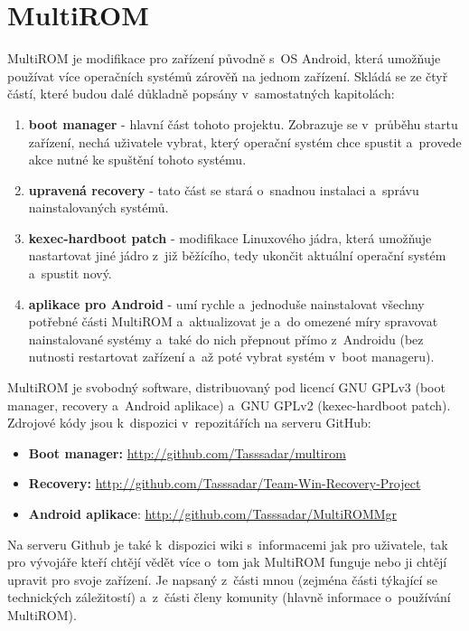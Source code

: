 \documentclass[12pt, a4paper, oneside]{article}
\newcommand{\B}{\textbf} %
\begin{document}
\section{MultiROM}
MultiROM je modifikace pro zařízení původně s~OS Android, která umožňuje používat více operačních systémů zárověň na jednom zařízení. Skládá se ze čtyř částí, které budou dalé důkladně popsány v~samostatných kapitolách:

\begin{enumerate}
    \item \B{boot manager} - hlavní část tohoto projektu. Zobrazuje se v~průběhu startu zařízení, nechá uživatele vybrat, který operační systém chce spustit a~provede akce nutné ke spuštění tohoto systému.
    \item \B{upravená recovery} - tato část se stará o~snadnou instalaci a~správu nainstalovaných systémů.
    \item \B{kexec-hardboot patch} - modifikace Linuxového jádra, která umožňuje nastartovat jiné jádro z~již běžícího, tedy ukončit aktuální operační systém a~spustit nový.
    \item \B{aplikace pro Android} - umí rychle a~jednoduše nainstalovat všechny potřebné části MultiROM a~aktualizovat je a~do omezené míry spravovat nainstalované systémy a~také do nich přepnout přímo z~Androidu (bez nutnosti restartovat zařízení a~až poté vybrat systém v~boot manageru).
\end{enumerate}

MultiROM je svobodný software, distribuovaný pod licencí GNU GPLv3 (boot manager, recovery a~Android aplikace) a~GNU GPLv2 (kexec-hardboot patch). Zdrojové kódy jsou k~dispozici v~repozitářích na serveru GitHub:
\begin{itemize}
    \item \B{Boot manager:} \url{http://github.com/Tasssadar/multirom}
    \item \B{Recovery:} \url{http://github.com/Tasssadar/Team-Win-Recovery-Project}
    \item \B{Android aplikace}: \url{http://github.com/Tasssadar/MultiROMMgr}
\end{itemize}

Na serveru Github je také k~dispozici wiki s~informacemi jak pro uživatele, tak pro vývojáře kteří chtějí vědět více o~tom jak MultiROM funguje nebo ji chtějí upravit pro svoje zařízení. Je napsaný z~části mnou (zejména části týkající se technických záležitostí) a~z~části členy komunity (hlavně informace o~používání MultiROM).
\end{document}
